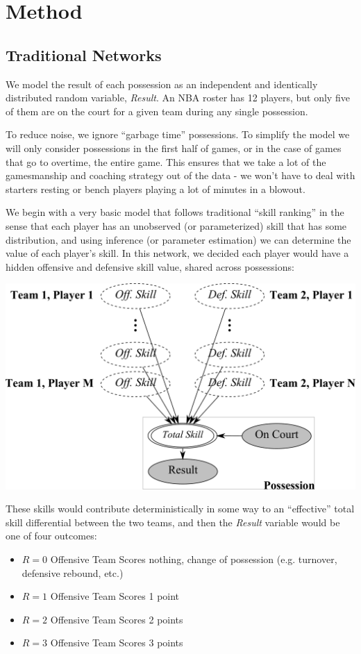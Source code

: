 \documentclass[10pt,twocolumn]{article}
\begin{document}

\section{Method}
\subsection{Traditional Networks}

We model the result of each possession as an independent and identically distributed random variable, \emph{Result}.
An NBA roster has 12 players, but only five of them are on the court for a given team during any single possession.

To reduce noise, we ignore ``garbage time'' possessions. To simplify the model we will only consider possessions in the first half of games, or in the case of games that go to overtime, the entire game. This ensures that we take a lot of the gamesmanship and coaching strategy out of the data - we won't have to deal with starters resting or bench players playing a lot of minutes in a blowout.

We begin with a very basic model that follows traditional ``skill ranking'' in the sense that each player has an unobserved (or parameterized) skill that has some distribution, and using inference (or parameter estimation) we can determine the value of each player's skill.
In this network, we decided each player would have a hidden offensive and defensive skill value, shared across possessions:
\begin{center}
	\includegraphics[width=0.90\linewidth]{figures/network}
\end{center}
These skills would contribute deterministically in some way to an ``effective'' total skill differential between the two teams, and then the \emph{Result} variable would be one of four outcomes:
\begin{itemize}
\item $R=0$ Offensive Team Scores nothing, change of possession (e.g. turnover, defensive rebound, etc.)
\item $R=1$ Offensive Team Scores 1 point
\item $R=2$ Offensive Team Scores 2 points
\item $R=3$ Offensive Team Scores 3 points
\end{itemize}
\end{document}
